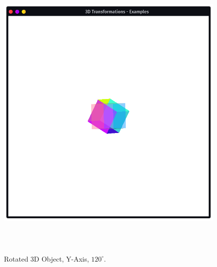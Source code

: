 \documentclass[12pt, a4]{article}
\begin{document}
\subsection*{}
\begin{figure}[h]
\centering
\caption{Rotated 3D Object, Y-Axis, $120^{\circ}$.}
\includegraphics[height=15cm, width=15cm]{Outputs/Output-2.png}
\end{figure}

\newpage
\end{document}
